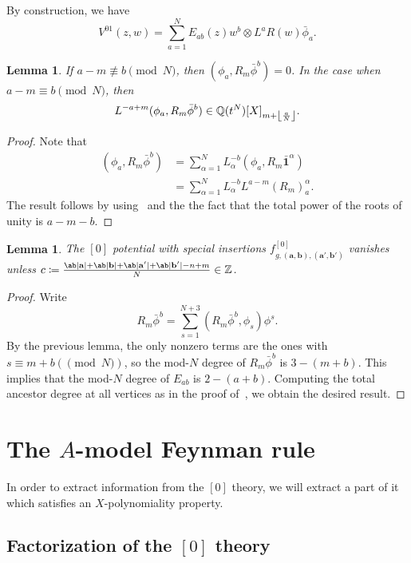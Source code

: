 \documentclass[10pt]{amsart}
\DeclarePairedDelimiter{\floor}{\lfloor}{\rfloor}
\newtheorem{lem}[thm]{Lemma}
\theoremstyle{definition}
\theoremstyle{remark}
\theoremstyle{plain}
\theoremstyle{definition}
\theoremstyle{remark}
\newcommand{\Z}{\mathbb{Z}}
\newcommand{\Q}{\mathbb{Q}}
\newcommand{\ba}{\mathbf{a}}
\newcommand{\bb}{\mathbf{b}}
\newcommand{\1}{\mathbf{1}}
\newcommand{\2}{\mathbf{2}}
\newcommand{\3}{\mathbf{3}}
\numberwithin{equation}{section}
\begin{document}
By construction, we have
\[ V^{01}(z,w) = \sum_{a=1}^N E_{ab}(z) w^b \otimes L^a R(w) \bar{\phi}_a. \]

\begin{lem}
    If $a-m \not\equiv b \pmod{N}$, then $(\phi_a, R_m \bar{\phi}^b) = 0$. In the case when $a-m \equiv b \pmod{N}$, then
    \[ L^{-a+m}(\phi_a, R_m \bar{\phi}^b) \in \Q(t^N)[X]_{m+\floor*{\frac{a}{N}}}. \]
\end{lem}

\begin{proof}
    Note that
    \begin{align*}
        (\phi_a, R_m \bar{\phi}^b) &= \sum_{\alpha=1}^N L_{\alpha}^{-b} (\phi_a, R_m \bar{\1}^{\alpha}) \\
        &= \sum_{\alpha=1}^N L_{\alpha}^{-b} L^{a-m} (R_m)_a^{\alpha}.
    \end{align*}
    The result follows by using~ and the the fact that the total power of the roots of unity is $a-m-b$.
\end{proof}

\begin{lem}
    The $[0]$ potential with special insertions $f_{g,(\ba,\bb),(\ba',\bb')}^{[0]}$ vanishes unless
    $c \coloneqq \frac{\ab|\ba| + \ab|\bb| + \ab|\ba'| + \ab|\bb'| -n+m}{N} \in \Z$. 
\end{lem}

\begin{proof}
    Write
    \[ R_m \bar{\phi}^{b} = \sum_{s=1}^{N+3} (R_m \bar{\phi}^b, \phi_s) \phi^s. \]
    By the previous lemma, the only nonzero terms are the ones with $s \equiv m+b (\pmod N)$, so the mod-$N$ degree of $R_m\bar{\phi}^b$ is $3-(m+b)$. This implies that the mod-$N$ degree of $E_{ab}$ is $2-(a+b)$. Computing the total ancestor degree at all vertices as in the proof of~, we obtain the desired result.
\end{proof}

\section{The $A$-model Feynman rule}%
\label{sec:The A model Feynman rule}

In order to extract information from the $[0]$ theory, we will extract a part of it which satisfies an $X$-polynomiality property.

\subsection{Factorization of the $[0]$ theory}%
\label{sub:Factorization of the 0 theory}
\end{document}
